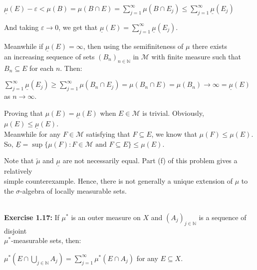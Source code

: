 \documentclass{book}
\newenvironment{myIndent}{%
   \begin{adjustwidth}{2.5em}{0em}%
}{%
   \end{adjustwidth}%
}
\newcommand{\blab}[1]{\textbf{#1}}
\newcommand{\mySepTwo}[1][.]{%
   {\noindent\color{#1}{\rule{6.5in}{0.5mm}}}\\%
}
\newcommand{\retTwo}{\hfill\bigbreak}
\begin{document}
\begin{enumerate}
\begin{myIndent}
      {\centering $\underline{\mu}(E) - \varepsilon < \mu(B) = \mu(B \cap E) = \sum\limits_{j=1}^\infty \mu(B \cap E_j) \leq \sum\limits_{j=1}^\infty\underline{\mu}(E_j)$\retTwo\par}

      And taking $\varepsilon \rightarrow 0$, we get that $\underline{\mu}(E) = \sum\limits_{j=1}^\infty \underline{\mu}(E_j)$.\retTwo

		Meanwhile if $\underline{\mu}(E) = \infty$, then using the semifiniteness of $\mu$ there exists\\ an increasing sequence of sets $(B_n)_{n \in \mathbb{N}}$ in $\mathcal{M}$ with finite measure such that\\ $B_n \subseteq E$ for each $n$. Then:

		{\centering $\sum\limits_{j=1}^\infty \underline{\mu}(E_j) \geq \sum\limits_{j=1}^\infty \mu(B_n \cap E_j) = \mu(B_n \cap E) = \mu(B_n) \to \infty = \underline{\mu}(E)$ as $n \to \infty$. \retTwo\par}

      Proving that $\mu(E) = \underline{\mu}(E)$ when $E \in \mathcal{M}$ is trivial. Obviously, $\mu(E) \leq \underline{\mu}(E)$.\\ [2pt] Meanwhile for any $F \in \mathcal{M}$ satisfying that $F \subseteq E$, we know that $\mu(F) \leq \mu(E)$.\\ [2pt] So, $\underline{E} = \sup\{\mu(F) : F \in \mathcal{M} \text{ and } F \subseteq E\} \leq \mu(E)$.\retTwo
   \end{myIndent}

   Note that $\widetilde{\mu}$ and $\underline{\mu}$ are not necessarily equal. Part (f) of this problem gives a relatively\\ [0pt] simple counterexample. Hence, there is not generally a unique extension of $\mu$ to the $\sigma$-algebra of locally measurable sets.
\end{enumerate}

\mySepTwo

\blab{Exercise 1.17:} If $\mu^*$ is an outer measure on $X$ and $(A_j)_{j\in \mathbb{N}}$ is a sequence of disjoint\\ $\mu^*$-measurable sets, then:

{\centering $\mu^*(E \cap \bigcup\limits_{j \in \mathbb{N}}A_j) = \sum\limits_{j=1}^\infty \mu^*(E \cap A_j)$ for any $E \subseteq X$.\retTwo\par}
\end{document}
